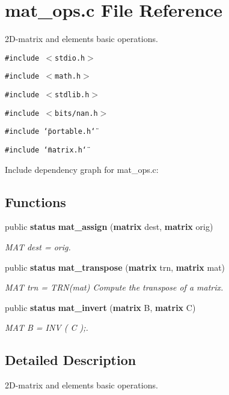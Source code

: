 \section{mat\_\-ops.c File Reference}
\label{mat__ops_8c}
2D-matrix and elements basic operations. 


{\tt \#include $<$stdio.h$>$}\par
{\tt \#include $<$math.h$>$}\par
{\tt \#include $<$stdlib.h$>$}\par
{\tt \#include $<$bits/nan.h$>$}\par
{\tt \#include \char`\"{}portable.h\char`\"{}}\par
{\tt \#include \char`\"{}matrix.h\char`\"{}}\par


Include dependency graph for mat\_\-ops.c:\subsection*{Functions}
\begin{CompactItemize}
\item 
public {\bf status} {\bf mat\_\-assign} ({\bf matrix} dest, {\bf matrix} orig)
\begin{CompactList}\small\item\em MAT dest = orig.\item\end{CompactList}\item 
public {\bf status} {\bf mat\_\-transpose} ({\bf matrix} trn, {\bf matrix} mat)
\begin{CompactList}\small\item\em MAT trn = TRN(mat) Compute the transpose of a matrix.\item\end{CompactList}\item 
public {\bf status} {\bf mat\_\-invert} ({\bf matrix} B, {\bf matrix} C)
\begin{CompactList}\small\item\em MAT B = INV ( C );.\item\end{CompactList}\end{CompactItemize}


\subsection{Detailed Description}
2D-matrix and elements basic operations.



